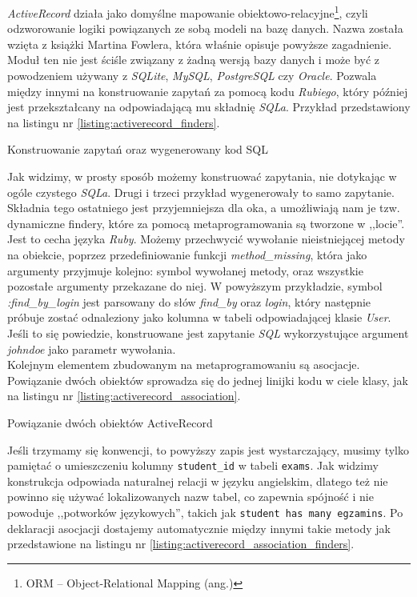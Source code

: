 \documentclass[a4paper,12pt]{article}
\begin{document}
\emph{ActiveRecord} działa jako domyślne mapowanie
obiektowo-relacyjne\footnote{ORM -- Object-Relational Mapping (ang.)},
czyli odzworowanie logiki powiązanych ze sobą modeli na bazę danych.
Nazwa została wzięta z książki Martina Fowlera\cite{martin-fowler}, która
właśnie opisuje powyższe zagadnienie. Moduł ten nie jest ściśle związany z żadną
wersją bazy danych i może być z powodzeniem używany z \emph{SQLite},
\emph{MySQL}, \emph{PostgreSQL} czy \emph{Oracle}. Pozwala między innymi na
konstruowanie zapytań za pomocą kodu \emph{Rubiego}, który później jest
przekształcany na odpowiadającą mu składnię \emph{SQLa}.
Przykład przedstawiony na listingu nr \ref{listing:activerecord_finders}.

\begin{listing}
  
  \caption{Konstruowanie zapytań oraz wygenerowany kod SQL}
  \label{listing:activerecord_finders}
\end{listing}


Jak widzimy, w prosty sposób możemy konstruować zapytania, nie dotykając w ogóle
czystego \emph{SQLa}. Drugi i trzeci przykład wygenerowały to samo zapytanie.
Składnia tego ostatniego jest przyjemniejsza dla oka, a umożliwiają nam je tzw.
dynamiczne findery, które za pomocą metaprogramowania są tworzone w ,,locie''.
Jest to cecha języka \emph{Ruby}. Możemy przechwycić wywołanie nieistniejącej
metody na obiekcie, poprzez przedefiniowanie funkcji \emph{method\_missing},
która jako argumenty przyjmuje kolejno: symbol wywołanej metody, oraz wszystkie
pozostałe argumenty przekazane do niej. W powyższym przykładzie, symbol
\emph{:find\_by\_login} jest parsowany do słów \emph{find\_by} oraz \emph{login}, który
następnie próbuje zostać odnaleziony jako kolumna w tabeli odpowiadającej klasie
\emph{User}. Jeśli to się powiedzie, konstruowane jest zapytanie \emph{SQL}
wykorzystujące argument \emph{johndoe} jako parametr wywołania.\\
Kolejnym elementem zbudowanym na metaprogramowaniu są asocjacje. Powiązanie
dwóch obiektów sprowadza się do jednej linijki kodu w ciele klasy, jak na
listingu nr \ref{listing:activerecord_association}.

\begin{listing}
  
  \caption{Powiązanie dwóch obiektów ActiveRecord}
  \label{listing:activerecord_association}
\end{listing}


Jeśli trzymamy się konwencji, to powyższy zapis jest wystarczający, musimy tylko
pamiętać o umieszczeniu kolumny \texttt{student\_id} w tabeli \texttt{exams}. Jak
widzimy konstrukcja odpowiada naturalnej relacji w języku angielskim, dlatego
też nie powinno się używać lokalizowanych nazw tabel, co zapewnia spójność i
nie powoduje ,,potworków językowych'', takich jak \texttt{student has many
egzamins}. Po deklaracji asocjacji dostajemy automatycznie między innymi takie
metody jak przedstawione na listingu nr \ref{listing:activerecord_association_finders}.
\end{document}
